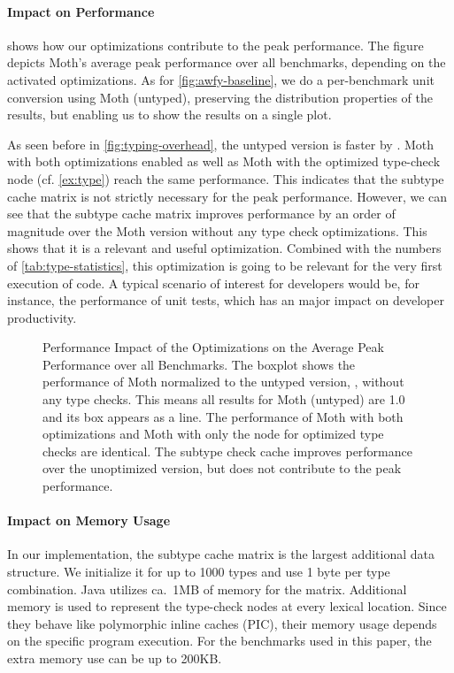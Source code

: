 \paragraph*{Impact on Performance}

 shows how our optimizations contribute
to the peak performance.
The figure depicts Moth's average peak performance over
all benchmarks, depending on the activated optimizations.
As for \cref{fig:awfy-baseline},
we do a per-benchmark unit conversion using Moth (untyped),
preserving the distribution properties of the results,
but enabling us to show the results on  a single plot.

As seen before in \cref{fig:typing-overhead}, the untyped version is faster by \OverheadTypingGMeanP.
Moth with both optimizations enabled as well as
Moth with the optimized type-check node (cf. \cref{ex:type})
reach the same performance.
This indicates that the subtype cache matrix is not strictly necessary for
the peak performance.
However, we can see that the subtype cache matrix improves performance
by an order of magnitude over the Moth version without any type check optimizations.
This shows that it is a relevant and useful optimization.
Combined with the numbers of \cref{tab:type-statistics},
this optimization is going to be relevant for the very first execution of code.
A typical scenario of interest for developers would be, for instance, the
performance of unit tests, which has an major impact on developer productivity.

\begin{figure}[htb]
  \centering
	\OptimizationOverview{}
  \caption{Performance Impact of the Optimizations on the Average Peak Performance over all Benchmarks.
  The boxplot shows the performance of Moth normalized to the untyped version, \ie,
  without any type checks.
  This means all results for Moth (untyped) are 1.0 and its box appears as a line.
  The performance of Moth with both optimizations and Moth
  with only the node for optimized type checks are identical.
  The subtype check cache improves performance over the unoptimized version,
  but does not contribute to the peak performance.
  }
	\label{fig:perf-impact-optimization}
\end{figure}

\paragraph*{Impact on Memory Usage}

In our implementation, the subtype cache matrix is the largest additional
data structure.
We initialize it for up to 1000 types and use 1 byte per type combination.
Java utilizes ca.\ 1MB of memory for the matrix.
Additional memory is used to represent the type-check nodes at every lexical location.
Since they behave like polymorphic inline caches (PIC)\citep{Hoelzle:91:PIC},
their memory usage depends on the specific program execution.
For the benchmarks used in this paper, the extra memory use can be up to 200KB.

